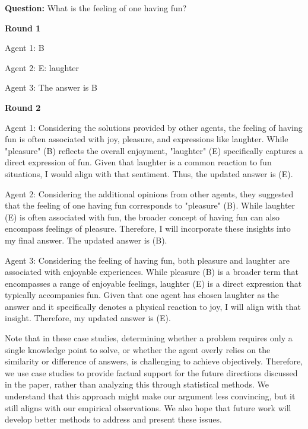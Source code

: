 \begin{tcolorbox}[colback=gray!10!white, colframe=black!70!white, breakable]
\textbf{Question:} What is the feeling of one having fun?

\textbf{Round 1}

Agent 1: B

Agent 2: E: laughter

Agent 3: The answer is B

\textbf{Round 2}

Agent 1: Considering the solutions provided by other agents, the feeling of having fun is often associated with joy, pleasure, and expressions like laughter. While "pleasure" (B) reflects the overall enjoyment, "laughter" (E) specifically captures a direct expression of fun. Given that laughter is a common reaction to fun situations, I would align with that sentiment. Thus, the updated answer is (E).

Agent 2: Considering the additional opinions from other agents, they suggested that the feeling of one having fun corresponds to "pleasure" (B). While laughter (E) is often associated with fun, the broader concept of having fun can also encompass feelings of pleasure. Therefore, I will incorporate these insights into my final answer. The updated answer is (B).

Agent 3: Considering the feeling of having fun, both pleasure and laughter are associated with enjoyable experiences. While pleasure (B) is a broader term that encompasses a range of enjoyable feelings, laughter (E) is a direct expression that typically accompanies fun. Given that one agent has chosen laughter as the answer and it specifically denotes a physical reaction to joy, I will align with that insight. Therefore, my updated answer is (E).



\end{tcolorbox}

Note that in these case studies, determining whether a problem requires only a single knowledge point to solve, or whether the agent overly relies on the similarity or difference of answers, is challenging to achieve objectively. Therefore, we use case studies to provide factual support for the future directions discussed in the paper, rather than analyzing this through statistical methods. We understand that this approach might make our argument less convincing, but it still aligns with our empirical observations. We also hope that future work will develop better methods to address and present these issues.


